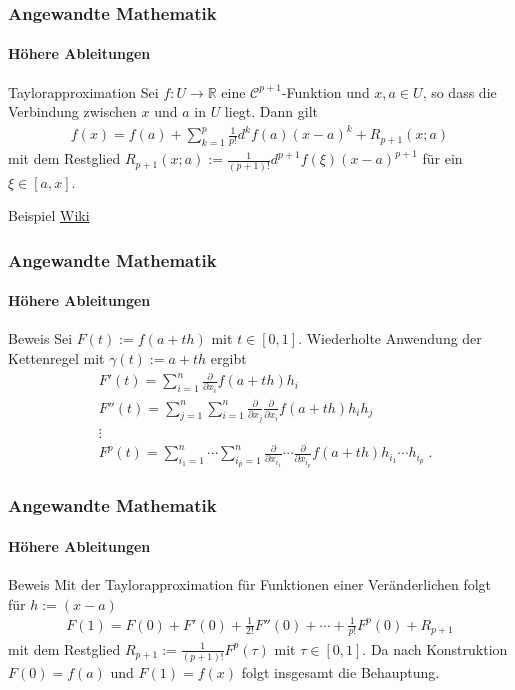 \documentclass{beamer}
\begin{document}
\begin{frame}
    \frametitle{Angewandte Mathematik}
\framesubtitle{Höhere Ableitungen}
    \begin{block}{Taylorapproximation}
Sei   $f: U \to \mathbb{R}$ eine $\mathcal{C}^{p+1}$-Funktion und $x,a \in U$, so dass die Verbindung zwischen $x$ und $a$ in $U$ liegt.
Dann gilt
\begin{align*}
f(x) = f(a) + \sum_{k=1}^{p}\frac{1}{p!} d^k f(a) (x-a)^k + R_{p+1} (x;a)
\end{align*}
mit dem Restglied $R_{p+1} (x;a) := \frac{1}{(p+1)!} d^{p+1}f(\xi) (x-a)^{p+1}$ für ein $\xi \in [a,x]$.

\end{block}
\begin{block}{Beispiel}
\href{https://de.wikipedia.org/wiki/Taylor-Formel\#Taylor-Formel_im_Mehrdimensionalen}{Wiki}
\end{block}
 \end{frame}


\begin{frame}
    \frametitle{Angewandte Mathematik}
\framesubtitle{Höhere Ableitungen}
    \begin{block}{Beweis}
Sei $F(t) := f(a + th)$ mit $t \in [0,1]$. Wiederholte Anwendung der Kettenregel mit $\gamma(t) := a +th$ ergibt
\begin{align*}
& F'(t) = \sum_{i=1}^n  \frac{\partial}{\partial x_{i}} f(a + th) h_i \\
& F''(t) =\sum_{j=1}^n \sum_{i=1}^n   \frac{\partial}{\partial x_{j}} \frac{\partial}{\partial x_{i}} f(a + th) h_i h_j \\
& \vdots \\
& F^p(t) =  \sum_{i_1=1}^n  \cdots \sum_{i_p=1}^n   \frac{\partial}{\partial x_{i_1}} \cdots \frac{\partial}{\partial x_{i_p}} f(a + th) h_{i_1} \cdots  h_{i_p}  \; .
\end{align*}
\end{block}
 \end{frame}

\begin{frame}
    \frametitle{Angewandte Mathematik}
\framesubtitle{Höhere Ableitungen}
    \begin{block}{Beweis}
Mit der Taylorapproximation für Funktionen einer Veränderlichen  folgt für $h := (x-a)$ 
\begin{align*}
 F(1) = F(0) + F'(0) + \frac{1}{2!} F''(0) + \cdots + \frac{1}{p!} F^p(0) + R_{p+1} 
\end{align*}
mit dem Restglied $ R_{p+1}  :=  \frac{1}{(p+1)!}  F^p(\tau)$ mit $\tau \in [0,1]$.
Da nach Konstruktion $F(0) = f(a)$ und $F(1)= f(x)$ folgt insgesamt die Behauptung.
\end{block}
 \end{frame}
\end{document}
